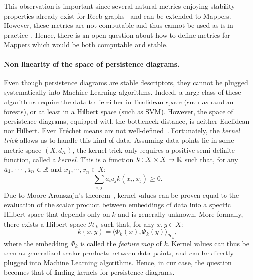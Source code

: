 This observation is important since several natural metrics enjoying stability properties already exist for Reeb graphs~\cite{Bauer16,Bauer14,deSilva16}
and can be extended to Mappers. 
However, these metrics are not computable and thus cannot be used as is in practice~\cite{Agarwal15}. Hence, there is an open question about how
to define metrics for Mappers which would be both computable and stable.


  

\paragraph*{Non linearity of the space of  persistence diagrams.}
%
Even though persistence diagrams are stable descriptors, they cannot be plugged systematically into Machine Learning algorithms.
Indeed, a large class of these algorithms require the data to lie either in Euclidean space (such as random forests), 
or at least in a Hilbert space (such as SVM).
However, the space of persistence diagrams, equipped with the bottleneck distance, is neither Euclidean nor Hilbert.
Even Fr\'echet means are not well-defined~\cite{Turner14}. Fortunately,
the {\em kernel trick} allows us to handle this kind of data.
Assuming data points lie in some metric space $(X,d_X)$, the kernel trick only requires a positive semi-definite function,  
called a {\em kernel}. This is a function $k:X\times X\rightarrow\mathbb{R}$ such that, for any $a_1,\cdots,a_n\in\mathbb{R}$ and $x_1,\cdots,x_n\in X$:
$$\sum_{i,j}a_ia_jk(x_i,x_j)\geq 0.$$ 
Due to Moore-Aronszajn's theorem~\cite{Aronszajn50}, kernel values can be proven equal to the evaluation
of the scalar product between embeddings of data into a specific Hilbert space that depends only on $k$ and is generally unknown. 
More formally, there exists a Hilbert space $\mathcal H_k$ such that, for any $x,y\in X$: 
$$k(x,y)=\langle\Phi_k(x),\Phi_k(y)\rangle_{\mathcal H_k},$$
where the embedding $\Phi_k$ is called the {\em feature map} of $k$.
Kernel values can thus be seen as generalized scalar products between data points, and can be directly plugged into Machine Learning algorithms. 
Hence, in our case, the question becomes that of finding kernels for persistence diagrams.


